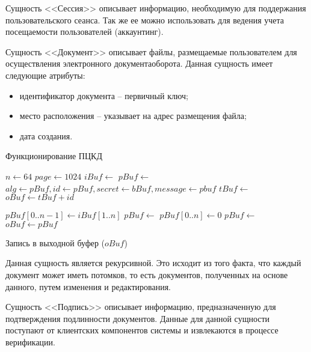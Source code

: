 Сущность <<Сессия>> описывает информацию, необходимую для поддержания
пользовательского сеанса. Так же ее можно использовать для ведения учета
посещаемости пользователей (аккаунтинг).

Сущность <<Документ>> описывает файлы, размещаемые пользователем для
осуществления электронного документаоборота. Данная сущность имеет следующие
атрибуты:

\begin{itemize}
  \item идентификатор документа -- первичный ключ;
  \item место расположения -- указывает на адрес размещения файла;
  \item дата создания.
\end{itemize}

\begin{algorithm}[h!]
\caption{Функционирование ПЦКД}          %
\label{alg:1}     
\small                      %
\begin{algorithmic}[1]      
\State $n \gets 64$ 
\State $page \gets 1024$ 
\Loop
  \State $iBuf \gets $ 
     
      \State $pBuf \gets $ 
      \State $alg \gets pBuf, id \gets pBuf, secret \gets bBuf, message \gets
      pbuf$ 
      \State $tBuf \gets$ 
      \State $oBuf \gets tBuf + id$ 
    \EndIf    
    
     
      
      \State $pBuf[0..n-1] \gets iBuf[1..n]$
      \State $pBuf \gets $   \State {}
      \State $pBuf[0..n] \gets 0$ 
      \State $pBuf \gets $ 
      \State $oBuf \gets pBuf$
    \EndIf
    
    \State Запись в выходной буфер ($oBuf$)
  \EndIf
\EndLoop

\end{algorithmic}
\end{algorithm}

Данная сущность является рекурсивной. Это исходит из того факта, что каждый
документ может иметь потомков, то есть документов, полученных на основе данного,
путем изменения и редактирования.

Сущность <<Подпись>> описывает информацию, предназначенную для подтверждения
подлинности документов. Данные для данной сущности поступают от клиентских
компонентов системы и извлекаются в процессе верификации.
